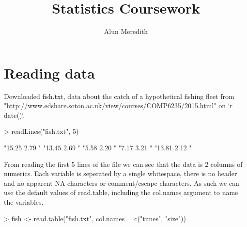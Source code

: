 \documentclass{article}
\begin{document}



\title{Statistics Coursework}
\author{Alun Meredith}
\maketitle
\section{Reading data}
Downloaded fish.txt, data about the catch of a hypothetical fishing fleet from "http://www.edshare.soton.ac.uk/view/courses/COMP6235/2015.html" on `r date()`. 
\begin{Schunk}
\begin{Sinput}
> readLines("fish.txt", 5)
\end{Sinput}
\begin{Soutput}
[1] "15.25 2.79 " "13.45 2.69 " "5.58 2.20 "  "7.17 3.21 "  "13.81 2.12 "
\end{Soutput}
\end{Schunk}
From reading the first 5 lines of the file we can see that the data is 2 columns of numerics. Each variable is seperated by a single whitespace, there is no header and no apparent NA characters or comment/escape characters. As such we can use the default values of read.table, including the col.names argument to name the variables.
\begin{Schunk}
\begin{Sinput}
> fish <- read.table("fish.txt", col.names = c("times", "size"))
\end{Sinput}
\end{Schunk}
\end{document}
